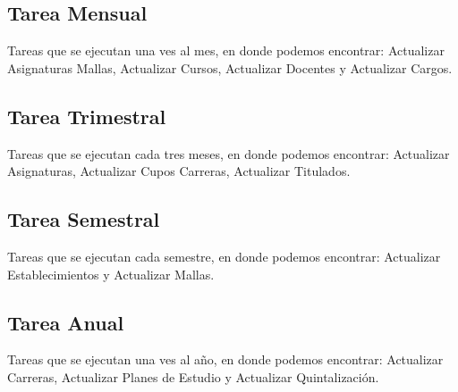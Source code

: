 \documentclass[a4paper,12pt,openany,oneside]{book}
\begin{document}
\subsection{Tarea Mensual}
Tareas que se ejecutan una ves al mes, en donde podemos encontrar: Actualizar Asignaturas Mallas, Actualizar Cursos, Actualizar Docentes y Actualizar Cargos.
\subsection{Tarea Trimestral}
Tareas que se ejecutan cada tres meses, en donde podemos encontrar: Actualizar Asignaturas, Actualizar Cupos Carreras, Actualizar Titulados.
\subsection{Tarea Semestral}
Tareas que se ejecutan cada semestre, en donde podemos encontrar: Actualizar Establecimientos y Actualizar Mallas.
\subsection{Tarea Anual}
Tareas que se ejecutan una ves al año, en donde podemos encontrar: Actualizar Carreras, Actualizar Planes de Estudio y Actualizar Quintalización.



\end{document}
